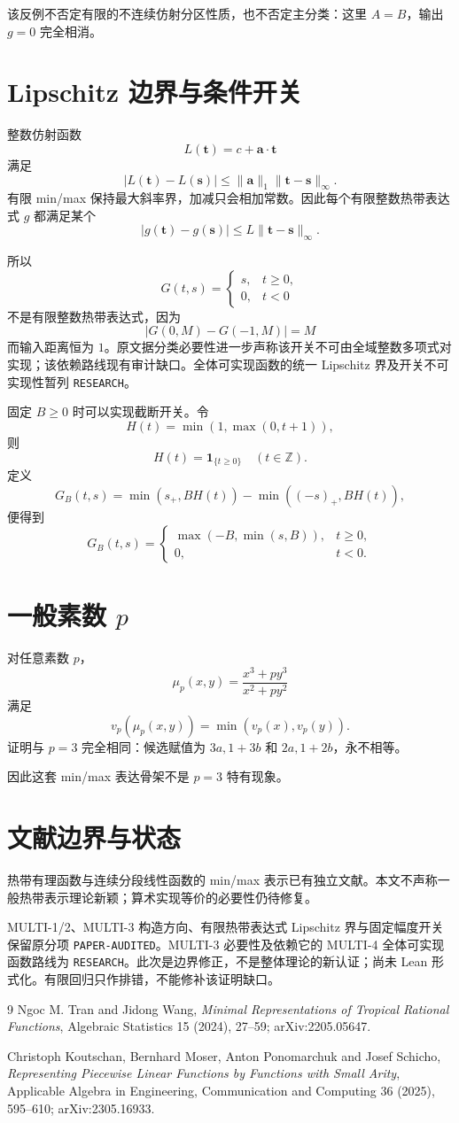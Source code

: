 \documentclass[11pt,a4paper]{ctexart}
\begin{document}
该反例不否定有限的不连续仿射分区性质，也不否定主分类：这里 \(A=B\)，输出 \(g=0\) 完全相消。

\section{Lipschitz 边界与条件开关}
整数仿射函数
\[
L(\mathbf t)=c+\mathbf a\cdot\mathbf t
\]
满足
\[
|L(\mathbf t)-L(\mathbf s)|
\le
\|\mathbf a\|_1
\|\mathbf t-\mathbf s\|_\infty.
\]
有限 min/max 保持最大斜率界，加减只会相加常数。因此每个有限整数热带表达式 \(g\) 都满足某个
\[
\boxed{
|g(\mathbf t)-g(\mathbf s)|
\le
L\|\mathbf t-\mathbf s\|_\infty.
}
\]

所以
\[
G(t,s)=
\begin{cases}
s,&t\ge0,\\
0,&t<0
\end{cases}
\]
不是有限整数热带表达式，因为
\[
|G(0,M)-G(-1,M)|=M
\]
而输入距离恒为 \(1\)。原文据分类必要性进一步声称该开关不可由全域整数多项式对实现；该依赖路线现有审计缺口。全体可实现函数的统一 Lipschitz 界及开关不可实现性暂列 \texttt{RESEARCH}。

固定 \(B\ge0\) 时可以实现截断开关。令
\[
H(t)=\min(1,\max(0,t+1)),
\]
则
\[
H(t)=\mathbf1_{\{t\ge0\}}
\quad(t\in\mathbb Z).
\]
定义
\[
G_B(t,s)
=
\min(s_+,BH(t))
-
\min((-s)_+,BH(t)),
\]
便得到
\[
G_B(t,s)=
\begin{cases}
\max(-B,\min(s,B)),&t\ge0,\\
0,&t<0.
\end{cases}
\]

\section{一般素数 \(p\)}
对任意素数 \(p\)，
\[
\mu_p(x,y)=
\frac{x^3+py^3}{x^2+py^2}
\]
满足
\[
\boxed{
v_p(\mu_p(x,y))
=
\min(v_p(x),v_p(y)).
}
\]
证明与 \(p=3\) 完全相同：候选赋值为 \(3a,1+3b\) 和 \(2a,1+2b\)，永不相等。

因此这套 min/max 表达骨架不是 \(p=3\) 特有现象。

\section{文献边界与状态}
热带有理函数与连续分段线性函数的 min/max 表示已有独立文献。本文不声称一般热带表示理论新颖；算术实现等价的必要性仍待修复。

MULTI-1/2、MULTI-3 构造方向、有限热带表达式 Lipschitz 界与固定幅度开关保留原分项 \texttt{PAPER-AUDITED}。MULTI-3 必要性及依赖它的 MULTI-4 全体可实现函数路线为 \texttt{RESEARCH}。此次是边界修正，不是整体理论的新认证；尚未 Lean 形式化。有限回归只作排错，不能修补该证明缺口。

\begin{thebibliography}{9}
Ngoc M. Tran and Jidong Wang,
\emph{Minimal Representations of Tropical Rational Functions},
Algebraic Statistics 15 (2024), 27--59; arXiv:2205.05647.

Christoph Koutschan, Bernhard Moser, Anton Ponomarchuk and Josef Schicho,
\emph{Representing Piecewise Linear Functions by Functions with Small Arity},
Applicable Algebra in Engineering, Communication and Computing 36 (2025), 595--610; arXiv:2305.16933.
\end{thebibliography}
\end{document}
